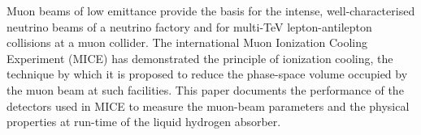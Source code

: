 Muon beams of low emittance provide the basis for the intense,
well-characterised neutrino beams of a neutrino factory and for
multi-TeV lepton-antilepton collisions at a muon collider.
The international Muon Ionization Cooling Experiment (MICE) has
demonstrated the principle of ionization cooling, the technique by
which it is proposed to reduce the phase-space volume occupied by the
muon beam at such facilities. 
This paper documents the performance of the detectors used in MICE
to measure the muon-beam parameters and the physical properties at run-time of the liquid hydrogen absorber.


